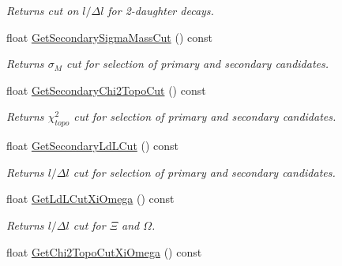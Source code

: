 \begin{DoxyCompactItemize}
\begin{DoxyCompactList}\small\item\em Returns cut on $l/\Delta l$ for 2-\/daughter decays. \end{DoxyCompactList}\item 
float \hyperlink{classKFParticleFinder_a8fab5001542c89602ae9ebfc61837676}{Get\+Secondary\+Sigma\+Mass\+Cut} () const \hypertarget{classKFParticleFinder_a8fab5001542c89602ae9ebfc61837676}{}\label{classKFParticleFinder_a8fab5001542c89602ae9ebfc61837676}

\begin{DoxyCompactList}\small\item\em Returns $\sigma_{M}$ cut for selection of primary and secondary candidates. \end{DoxyCompactList}\item 
float \hyperlink{classKFParticleFinder_a6f62d506a6f6e1efa0e2db846d7c4440}{Get\+Secondary\+Chi2\+Topo\+Cut} () const \hypertarget{classKFParticleFinder_a6f62d506a6f6e1efa0e2db846d7c4440}{}\label{classKFParticleFinder_a6f62d506a6f6e1efa0e2db846d7c4440}

\begin{DoxyCompactList}\small\item\em Returns $\chi^2_{topo}$ cut for selection of primary and secondary candidates. \end{DoxyCompactList}\item 
float \hyperlink{classKFParticleFinder_ad9ad8be085e5f6730ea1cd48511187f8}{Get\+Secondary\+Ld\+L\+Cut} () const \hypertarget{classKFParticleFinder_ad9ad8be085e5f6730ea1cd48511187f8}{}\label{classKFParticleFinder_ad9ad8be085e5f6730ea1cd48511187f8}

\begin{DoxyCompactList}\small\item\em Returns $l/\Delta l$ cut for selection of primary and secondary candidates. \end{DoxyCompactList}\item 
float \hyperlink{classKFParticleFinder_a62739992a0aac4616a05a3461a82db08}{Get\+Ld\+L\+Cut\+Xi\+Omega} () const \hypertarget{classKFParticleFinder_a62739992a0aac4616a05a3461a82db08}{}\label{classKFParticleFinder_a62739992a0aac4616a05a3461a82db08}

\begin{DoxyCompactList}\small\item\em Returns $l/\Delta l$ cut for $\Xi$ and $\Omega$. \end{DoxyCompactList}\item 
float \hyperlink{classKFParticleFinder_afaa4caf4f1319d4988e15250519ab9b0}{Get\+Chi2\+Topo\+Cut\+Xi\+Omega} () const \hypertarget{classKFParticleFinder_afaa4caf4f1319d4988e15250519ab9b0}{}\label{classKFParticleFinder_afaa4caf4f1319d4988e15250519ab9b0}


\end{DoxyCompactItemize}
